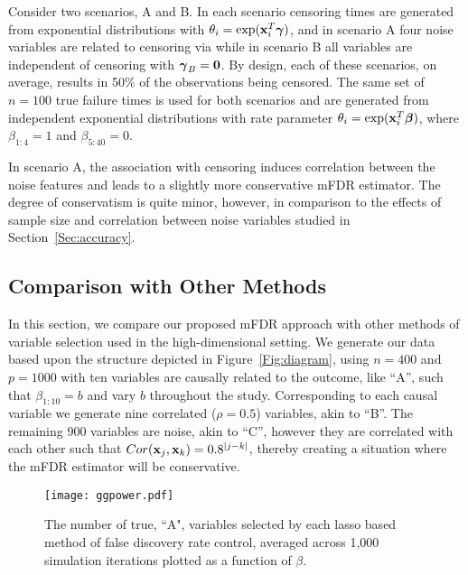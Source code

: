 Consider two scenarios, A and B. In each scenario censoring times are generated from exponential distributions with $\theta_{i} = \exp(\mathbf{x}_i^T \boldsymbol{\gamma})$, and in scenario A four noise variables are related to censoring via
while in scenario B all variables are independent of censoring with $\boldsymbol{\gamma}_B = \mathbf{0}$.  By design, each of these scenarios, on average, results in 50\% of the observations being censored.  The same set of $n = 100$ true failure times is used for both scenarios and are generated from independent exponential distributions with rate parameter $\theta_i = \exp(\mathbf{x}_i^T \boldsymbol{\beta})$, where $\beta_{1:4} = 1$ and $\beta_{5:40} = 0$.

In scenario A, the association with censoring induces correlation between the noise features and leads to a slightly more conservative mFDR estimator. The degree of conservatism is quite minor, however, in comparison to the effects of sample size and correlation between noise variables studied in Section~\ref{Sec:accuracy}.

\subsection{Comparison with Other Methods}

In this section, we compare our proposed mFDR approach with other methods of variable selection used in the high-dimensional setting. We generate our data based upon the structure depicted in Figure~\ref{Fig:diagram}, using $n = 400$ and $p = 1000$ with ten variables are causally related to the outcome, like ``A'', such that $\beta_{1:10} = b$ and vary $b$ throughout the study. Corresponding to each causal variable we generate nine correlated ($\rho = 0.5$) variables, akin to ``B''. The remaining 900 variables are noise, akin to ``C'', however they are correlated with each other such that $Cor(\mathbf{x}_j,\mathbf{x}_k) = 0.8^{|j - k|}$, thereby creating a situation where the mFDR estimator will be conservative.


\begin{figure} [b!]
 \centering
  \texttt{[image: ggpower.pdf]}
  \caption{\label{Fig:lassopower} The number of true, ``A", variables selected by each lasso based method of false discovery rate control, averaged across 1,000 simulation iterations plotted as a function of $\beta$.}
\end{figure}

